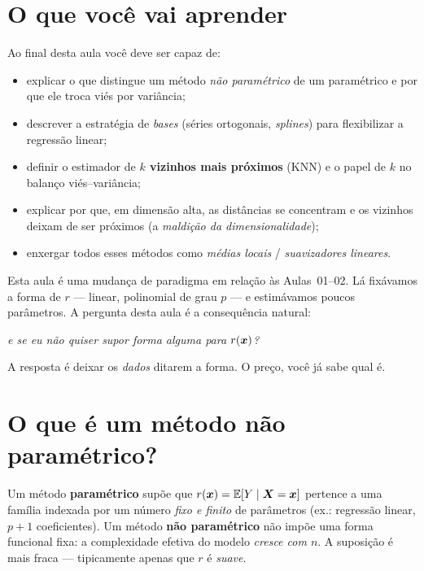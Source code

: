 \documentclass[11pt,a4paper]{article}
\title{}
\date{}
\begin{document}

\section*{O que você vai aprender}
Ao final desta aula você deve ser capaz de:
\begin{itemize}[leftmargin=1.4cm]
  \item explicar o que distingue um método \emph{não paramétrico} de um
        paramétrico e por que ele troca viés por variância;
  \item descrever a estratégia de \emph{bases} (séries ortogonais, \emph{splines})
        para flexibilizar a regressão linear;
  \item definir o estimador de \textbf{$k$ vizinhos mais próximos} (KNN) e o papel
        de $k$ no balanço viés--variância;
  \item explicar por que, em dimensão alta, as distâncias se concentram e os vizinhos
        deixam de ser próximos (a \emph{maldição da dimensionalidade});
  \item enxergar todos esses métodos como \emph{médias locais} / \emph{suavizadores
        lineares}.
\end{itemize}

\noindent
Esta aula é uma mudança de paradigma em relação às Aulas~01--02. Lá fixávamos a
forma de $r$ --- linear, polinomial de grau $p$ --- e estimávamos poucos parâmetros.
A pergunta desta aula é a consequência natural:

\begin{center}\itshape
  e se eu não quiser supor forma alguma para $r(\bm{x})$?
\end{center}

\noindent
A resposta é deixar os \emph{dados} ditarem a forma. O preço, você já sabe qual é.

\section{O que é um método não paramétrico?}
Um método \textbf{paramétrico} supõe que $r(\bm{x})=\mathbb{E}[Y\mid\bm{X}=\bm{x}]$ pertence a uma
família indexada por um número \emph{fixo e finito} de parâmetros (ex.: regressão
linear, $p+1$ coeficientes). Um método \textbf{não paramétrico} não impõe uma
forma funcional fixa: a complexidade efetiva do modelo \emph{cresce com $n$}. A
suposição é mais fraca --- tipicamente apenas que $r$ é \emph{suave}.
\end{document}
